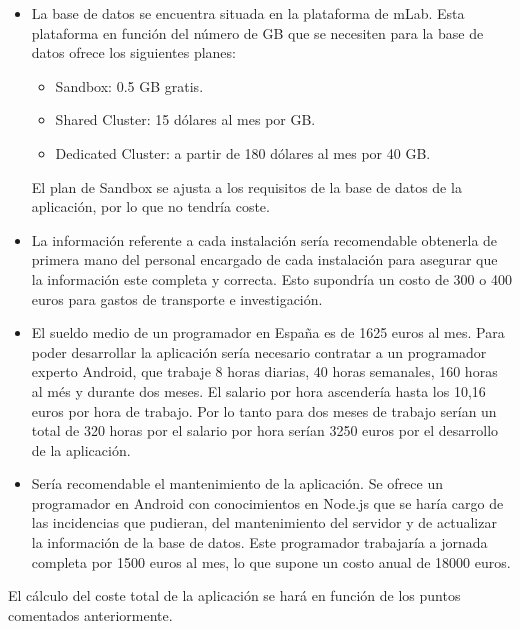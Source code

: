 \begin{itemize}
    \item La base de datos se encuentra situada en la plataforma de mLab. Esta plataforma en función del número de GB que se necesiten para la base de datos ofrece los siguientes planes:
    \begin{itemize}
        \item Sandbox: 0.5 GB gratis. 
        \item Shared Cluster: 15 dólares al mes por GB.
        \item Dedicated Cluster: a partir de 180 dólares al mes por 40 GB. 
    \end{itemize} 

    El plan de Sandbox se ajusta a los requisitos de la base de datos de la aplicación, por lo que no tendría coste. 
    
    \item La información referente a cada instalación sería recomendable obtenerla de primera mano del personal encargado de cada instalación para asegurar que la información este completa y correcta. Esto supondría un costo de 300 o 400 euros para gastos de transporte e investigación.
    \item  El sueldo medio de un programador en España es de 1625 euros al mes. Para poder desarrollar la aplicación sería necesario contratar a un programador experto Android, que trabaje 8 horas diarias, 40 horas semanales, 160 horas al més y durante dos meses. El salario por hora ascendería hasta los 10,16 euros por hora de trabajo. Por lo tanto para dos meses  de trabajo serían un total de 320 horas por el salario por hora serían 3250 euros por el desarrollo de la aplicación. 
    \item Sería recomendable el mantenimiento de la aplicación. Se ofrece un programador en Android con conocimientos en Node.js que se haría cargo de las incidencias que pudieran, del mantenimiento del servidor y de actualizar la información de la base de datos. Este programador trabajaría a jornada completa por  1500 euros al mes, lo que supone  un costo anual de 18000 euros.  
\end{itemize}  

El cálculo del coste total de la aplicación se hará en función de los puntos comentados anteriormente.

